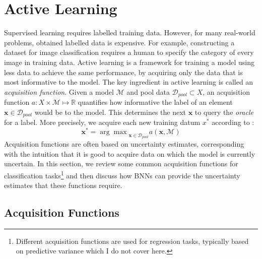 \documentclass[11pt, a4paper, bibliography=totoc]{report}
\newcommand{\reals}{\mathbb{R}}
\newcommand{\x}{\mathbf{x}}
\begin{document}
\chapter{Active Learning}
Supervised learning requires labelled training data. However, for many real-world problems, obtained labelled data is expensive. For example, constructing a dataset for image classification requires a human to specify the category of every image in training data. Active learning \cite{cohn1996active} is a framework for training a model using less data to achieve the same performance, by acquiring only the data that is most informative to the model. The key ingredient in active learning is called an \textit{acquisition function}. Given a model $ \mathcal{M} $ and pool data $ \mathcal{D}_{pool} \subset X $, an acquisition function $ a : X \times \mathcal{M} \mapsto \reals $ quantifies how informative the label of an element $ \x \in \mathcal{D}_{pool} $ would be to the model. This determines the next $ \x $ to query the \textit{oracle} for a label. More precisely, we acquire each new training datum $ x^* $ according to \cite{Gal2017b}:
\[ \x^* = {\arg\max}_{\x \in \mathcal{D}_{pool}} a(\x, \mathcal{M}) \]
Acquisition functions are often based on uncertainty estimates, corresponding with the intuition that it is good to acquire data on which the model is currently uncertain. In this section, we review some common acquisition functions for classification tasks\footnote{Different acquisition functions are used for regression tasks, typically based on predictive variance \cite[p.~47]{Gal2017a} which I do not cover here.} and then discuss how BNNs can provide the uncertainty estimates that these functions require. %

\section{Acquisition Functions} \label{sec:acq_funcs}
\end{document}

